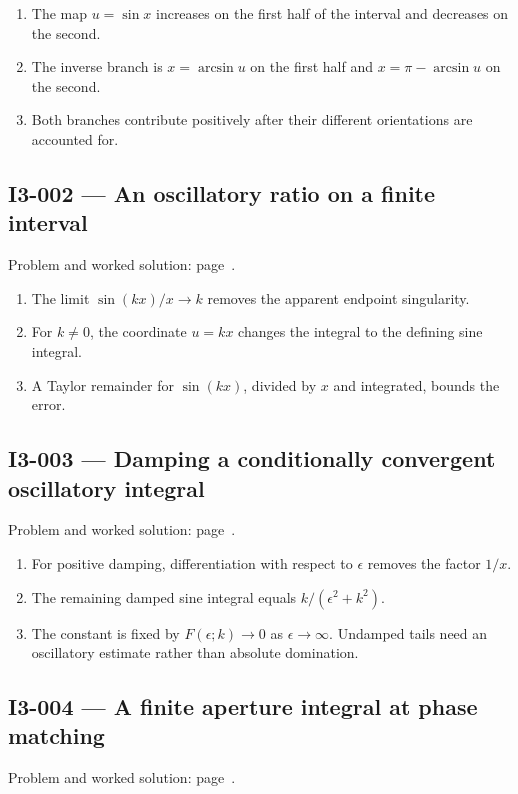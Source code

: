 \documentclass[11pt,oneside,openany]{book}
\begin{document}
\begin{enumerate}
\item The map \(u=\sin x\) increases on the first half of the interval and decreases on the second.
\item The inverse branch is \(x=\arcsin u\) on the first half and \(x=\pi-\arcsin u\) on the second.
\item Both branches contribute positively after their different orientations are accounted for.
\end{enumerate}
\subsection*{I3-002 --- An oscillatory ratio on a finite interval}
\label{hints:I3-002}
Problem and worked solution: page~\pageref{problem:I3-002}.

\begin{enumerate}
\item The limit \(\sin(kx)/x\to k\) removes the apparent endpoint singularity.
\item For \(k\ne0\), the coordinate \(u=kx\) changes the integral to the defining sine integral.
\item A Taylor remainder for \(\sin(kx)\), divided by \(x\) and integrated, bounds the error.
\end{enumerate}
\subsection*{I3-003 --- Damping a conditionally convergent oscillatory integral}
\label{hints:I3-003}
Problem and worked solution: page~\pageref{problem:I3-003}.

\begin{enumerate}
\item For positive damping, differentiation with respect to \(\epsilon\) removes the factor \(1/x\).
\item The remaining damped sine integral equals \(k/(\epsilon^2+k^2)\).
\item The constant is fixed by \(F(\epsilon;k)\to0\) as \(\epsilon\to\infty\). Undamped tails need an oscillatory estimate rather than absolute domination.
\end{enumerate}
\subsection*{I3-004 --- A finite aperture integral at phase matching}
\label{hints:I3-004}
Problem and worked solution: page~\pageref{problem:I3-004}.
\end{document}
